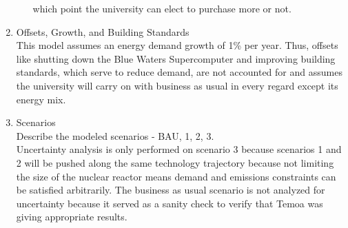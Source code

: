 \begin{enumerate}
\begin{itemize}
    which point the university can elect to purchase more or not.
  \end{itemize}
  \item Offsets, Growth, and Building Standards \\
  This model assumes an energy demand growth of 1\% per year. Thus, offsets like
  shutting down the Blue Waters Supercomputer and improving building standards,
  which serve to reduce demand, are not accounted for and assumes the university
  will carry on with business as usual in every regard except its energy mix.
  \item Scenarios \\
  Describe the modeled scenarios - BAU, 1, 2, 3. \\
  Uncertainty analysis is only performed on scenario 3 because scenarios 1 and 2
  will be pushed along the same technology trajectory because not limiting the
  size of the nuclear reactor means demand and emissions constraints can be
  satisfied arbitrarily. The business as usual scenario is not analyzed for
  uncertainty because it served as a sanity check to verify that Temoa was giving
  appropriate results.
\end{enumerate}
